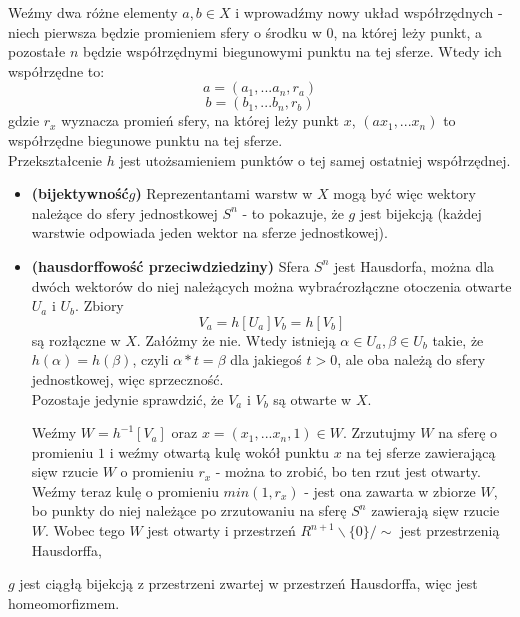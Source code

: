 Weźmy dwa różne elementy $ a, b \in X $ i wprowadźmy nowy układ współrzędnych - niech pierwsza będzie promieniem sfery o środku w $0$, na której leży punkt, a pozostałe $n$ będzie współrzędnymi biegunowymi punktu na tej sferze. Wtedy ich współrzędne to:
$$ 
a = (a_1, ... a_n, r_a)
$$
$$
b = (b_1, ... b_n, r_b) 
$$
gdzie $ r_x $ wyznacza promień sfery, na której leży punkt $ x $, $ (a x_1, ... x_n) $ to współrzędne biegunowe punktu na tej sferze.\\
Przekształcenie $h$ jest utożsamieniem punktów o tej samej ostatniej współrzędnej.
\begin{itemize}
\item \textbf{(bijektywność$g$)} Reprezentantami warstw w $X$ mogą być więc wektory należące do sfery jednostkowej $S^n$ - to pokazuje, że $g$ jest bijekcją (każdej warstwie odpowiada jeden wektor na sferze jednostkowej).
\item \textbf{(hausdorffowość przeciwdziedziny)} Sfera $S^n$ jest Hausdorfa, można dla dwóch wektorów do niej należących można wybraćrozłączne otoczenia otwarte $U_a$ i $U_b$.
Zbiory 
$$
V_a = h[U_a]
V_b = h[V_b]
$$
są rozłączne w $X$. Załóżmy że nie. Wtedy istnieją $ \alpha \in U_a, \beta \in U_b $ takie, że $ h(\alpha) = h(\beta) $, czyli $\alpha * t = \beta$ dla jakiegoś $t > 0$, ale oba należą do sfery jednostkowej, więc sprzeczność.\\
Pozostaje jedynie sprawdzić, że $V_a$ i $V_b$ są otwarte w $X$.

Weźmy $ W = h^{-1}[V_a] $ oraz $ x = (x_1, ... x_n, 1) \in W $. Zrzutujmy $W$ na sferę o promieniu $1$ i weźmy otwartą kulę wokół punktu $x$ na tej sferze zawierającą sięw rzucie $W$ o promieniu $r_x$ - można to zrobić, bo ten rzut jest otwarty. \\
Weźmy teraz kulę o promieniu $min(1, r_x)$ - jest ona zawarta w zbiorze $W$, bo punkty do niej należące po zrzutowaniu na sferę $S^n$ zawierają sięw rzucie $W$. Wobec tego $W$ jest otwarty i przestrzeń  $R^{n+1} \backslash \{0\} / \sim$  jest przestrzenią Hausdorffa, 
\end{itemize}

$g$ jest ciągłą bijekcją z przestrzeni zwartej w przestrzeń Hausdorffa, więc jest homeomorfizmem.
